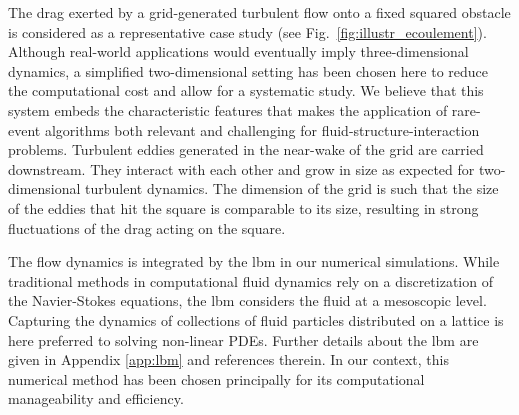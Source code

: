 \documentclass{jfm}
\begin{document}
% 
The drag exerted by a grid-generated turbulent flow onto a fixed squared obstacle is considered as a representative case study (see Fig.~\ref{fig:illustr_ecoulement}).
% 
Although real-world applications would eventually imply three-dimensional dynamics, a simplified two-dimensional setting has been chosen here to reduce the computational cost and allow for a systematic study.
% 
We believe that this system embeds the characteristic features that makes the application of rare-event algorithms both relevant and challenging for fluid-structure-interaction problems.
% 
Turbulent eddies generated in the near-wake of the grid are carried downstream.
They interact with each other and grow in size as expected for two-dimensional turbulent dynamics.
The dimension of the grid is such that the size of the eddies that hit the square is comparable to its size, resulting in strong fluctuations of the drag acting on the square.
% 
% 
% 

% 
The flow dynamics is integrated by the \ac{lbm} in our numerical simulations.
While traditional methods in computational fluid dynamics rely on a discretization of the Navier-Stokes equations, the \ac{lbm} considers the fluid at a mesoscopic level.
Capturing the dynamics of collections of fluid particles distributed on a lattice is here preferred to solving non-linear PDEs.
Further details about the \ac{lbm} are given in Appendix \ref{app:lbm} and references therein.
In our context, this numerical method has been chosen principally for its computational manageability and efficiency.
\end{document}
